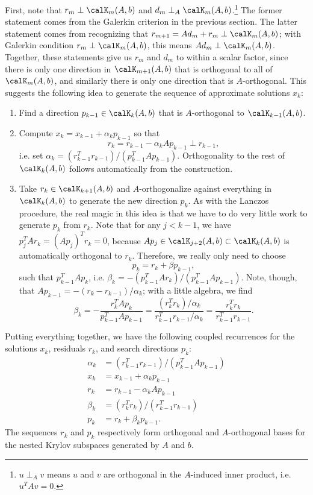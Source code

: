 \documentclass[12pt, leqno]{article} %
\begin{document}
First, note that $r_m \perp \calK_{m}(A,b)$ and $d_m \perp_A
\calK_{m}(A,b)$.\footnote{
  $u \perp_A v$ means $u$ and $v$ are orthogonal
  in the $A$-induced inner product, i.e. $u^T A v = 0$.
}  The former statement comes from the Galerkin
criterion in the previous section.  The latter statement comes from
recognizing that $r_{m+1} = Ad_m + r_m \perp \calK_{m}(A,b)$; with
Galerkin condition $r_m \perp \calK_{m}(A,b)$, this means $Ad_m \perp
\calK_{m}(A,b)$.  Together, these statements give us $r_m$ and $d_m$
to within a scalar factor, since there is only one direction in
$\calK_{m+1}(A,b)$ that is orthogonal to all of $\calK_{m}(A,b)$, and
similarly there is only one direction that is $A$-orthogonal.
This suggests the following idea to generate the sequence of
approximate solutions $x_k$:
\begin{enumerate}
\item
  Find a direction $p_{k-1} \in \calK_{k}(A,b)$ that is $A$-orthogonal
  to $\calK_{k-1}(A,b)$.
\item
  Compute $x_{k} = x_{k-1} + \alpha_k p_{k-1}$ so that
  \[
    r_k = r_{k-1} - \alpha_k A p_{k-1} \perp r_{k-1},
  \]
  i.e. set $\alpha_k = (r_{k-1}^T r_{k-1}) / (p_{k-1}^T A p_{k-1})$.
  Orthogonality to the rest of $\calK_{k}(A,b)$ follows
  automatically from the construction.
\item
  Take $r_k \in \calK_{k+1}(A,b)$ and $A$-orthogonalize against
  everything in $\calK_{k}(A,b)$ to generate the new direction $p_k$.
  As with the Lanczos procedure, the real magic in this idea is that
  we have to do very little work to generate $p_k$ from $r_k$.
  Note that for any $j < k-1$, we have $p_j^T A r_k = (Ap_j)^T r_k = 0$,
  because $Ap_j \in \calK_{j+2}(A,b) \subset \calK_k(A,b)$ is automatically
  orthogonal to $r_k$.  Therefore, we really only need to choose
  \[
    p_k = r_k + \beta p_{k-1},
  \]
  such that $p_{k-1}^T A p_k$, i.e.
  $\beta_k = -(p_{k-1}^T A r_k)/(p_{k-1}^T A p_{k-1})$.
  Note, though, that $Ap_{k-1} = -(r_{k}-r_{k-1})/\alpha_k$;
  with a little algebra, we find
  \[
    \beta_k = -\frac{r_k^T Ap_k}{p_{k-1}^T A p_{k-1}}
            = \frac{(r_k^T r_k)/\alpha_k}{r_{k-1}^T r_{k-1}/\alpha_k}
            = \frac{r_k^T r_k}{r_{k-1}^T r_{k-1}}.
  \]
\end{enumerate}

Putting everything together, we have the following coupled recurrences
for the solutions $x_k$, residuals $r_k$, and search directions $p_k$:
\begin{align*}
  \alpha_k &= (r_{k-1}^T r_{k-1})/(p_{k-1}^T A p_{k-1}) \\
  x_{k} &= x_{k-1} + \alpha_k p_{k-1} \\
  r_{k} &= r_{k-1} - \alpha_k A p_{k-1} \\
  \beta_{k} &= (r_k^T r_k)/(r_{k-1}^T r_{k-1}) \\
  p_k &= r_{k} + \beta_k p_{k-1}.
\end{align*}
The sequences $r_k$ and $p_k$ respectively form orthogonal and $A$-orthogonal
bases for the nested Krylov subspaces generated by $A$ and $b$.
\end{document}
